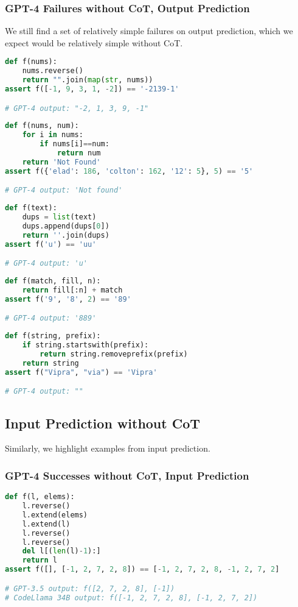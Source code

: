 \subsubsection{GPT-4 Failures without CoT, Output Prediction}
We still find a set of relatively simple failures on output prediction, which we expect would be relatively simple without CoT.

\begin{lstlisting}[language=python]
def f(nums):
    nums.reverse()
    return "".join(map(str, nums))
assert f([-1, 9, 3, 1, -2]) == '-2139-1'

# GPT-4 output: "-2, 1, 3, 9, -1"
\end{lstlisting}

\begin{lstlisting}[language=python]
def f(nums, num):
    for i in nums:
        if nums[i]==num:
            return num
    return 'Not Found'
assert f({'elad': 186, 'colton': 162, '12': 5}, 5) == '5'

# GPT-4 output: 'Not found'
\end{lstlisting}

\begin{lstlisting}[language=python]
def f(text):
    dups = list(text)
    dups.append(dups[0])
    return ''.join(dups)
assert f('u') == 'uu'

# GPT-4 output: 'u'
\end{lstlisting}

\begin{lstlisting}[language=python]
def f(match, fill, n):
    return fill[:n] + match
assert f('9', '8', 2) == '89'

# GPT-4 output: '889'
\end{lstlisting}

\begin{lstlisting}[language=python]
def f(string, prefix):
    if string.startswith(prefix):
        return string.removeprefix(prefix)
    return string
assert f("Vipra", "via") == 'Vipra'

# GPT-4 output: ""
\end{lstlisting}


\subsection{Input Prediction without CoT}
Similarly, we highlight examples from input prediction.
\subsubsection{GPT-4 Successes without CoT, Input Prediction}
\begin{lstlisting}[language=python]
def f(l, elems):
    l.reverse()
    l.extend(elems)
    l.extend(l)
    l.reverse()
    l.reverse()
    del l[(len(l)-1):]
    return l
assert f([], [-1, 2, 7, 2, 8]) == [-1, 2, 7, 2, 8, -1, 2, 7, 2]

# GPT-3.5 output: f([2, 7, 2, 8], [-1])
# CodeLlama 34B output: f([-1, 2, 7, 2, 8], [-1, 2, 7, 2])
\end{lstlisting}

